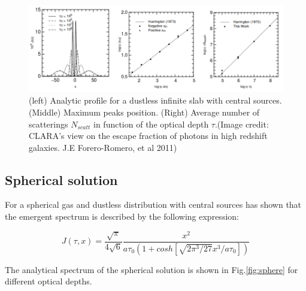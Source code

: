 \begin{figure}[H]
\begin{center}
\includegraphics[scale=0.4]{Figures/slab.png}
\end{center}\caption{(left) Analytic profile for a dustless infinite slab with central
\ly sources. (Middle) Maximum peaks position. (Right) Average number of 
scatterings $N_{scatt}$ in function of the optical depth $\tau$.(Image credit:  CLARA's view on the escape fraction of \ly photons in high redshift galaxies. J.E Forero-Romero, et al 2011)\label{fig:slab}}
\end{figure}

\subsection{Spherical solution}

For a spherical gas and dustless distribution with central \ly sources \citep{Dijkstra06} has shown that the emergent spectrum is described by the following expression:

\begin{equation}
J(\tau, x) = \dfrac{\sqrt{\pi}}{4\sqrt{6}}\dfrac{x^2}{a\tau_0 (1+cosh[\sqrt{2\pi^3/27}x^3/a\tau_0])}
\end{equation}

The analytical spectrum of the spherical solution 
is shown in Fig.\ref{fig:sphere} for different optical depths. 

